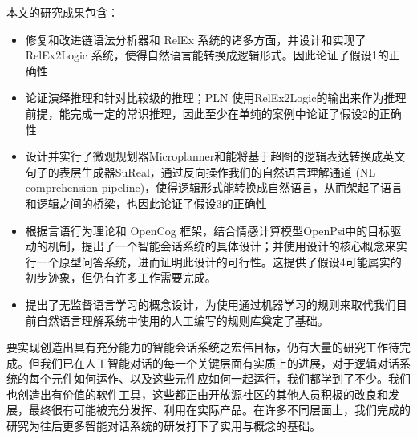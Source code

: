 本文的研究成果包含：

\begin{itemize}
\item 修复和改进链语法分析器和 RelEx 系统的诸多方面，并设计和实现了 RelEx2Logic 系统，使得自然语言能转换成逻辑形式。因此论证了假设1的正确性
\item 论证演绎推理和针对比较级的推理；PLN 使用RelEx2Logic的输出来作为推理前提，能完成一定的常识推理，因此至少在单纯的案例中论证了假设2的正确性
\item 设计并实行了微观规划器Microplanner和能将基于超图的逻辑表达转换成英文句子的表层生成器SuReal，通过反向操作我们的自然语言理解通道 (NL comprehension pipeline)，使得逻辑形式能转换成自然语言，从而架起了语言和逻辑之间的桥梁，也因此论证了假设3的正确性
\item 根据言语行为理论和 OpenCog 框架，结合情感计算模型OpenPsi中的目标驱动的机制，提出了一个智能会话系统的具体设计；并使用设计的核心概念来实行一个原型问答系统，进而证明此设计的可行性。这提供了假设4可能属实的初步迹象，但仍有许多工作需要完成。 
\item 提出了无监督语言学习的概念设计，为使用通过机器学习的规则来取代我们目前自然语言理解系统中使用的人工编写的规则库奠定了基础。

\end{itemize}

要实现创造出具有充分能力的智能会话系统之宏伟目标，仍有大量的研究工作待完成。但我们已在人工智能对话的每一个关键层面有实质上的进展，对于逻辑对话系统的每个元件如何运作、以及这些元件应如何一起运行，我们都学到了不少。我们也创造出有价值的软件工具，这些都正由开放源社区的其他人员积极的改良和发展，最终很有可能被充分发挥、利用在实际产品。在许多不同层面上，我们完成的研究为往后更多智能对话系统的研发打下了实用与概念的基础。
